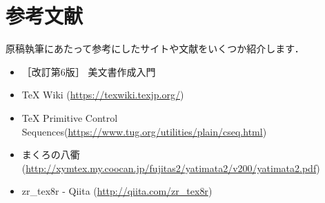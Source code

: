 \section*{参考文献}

原稿執筆にあたって参考にしたサイトや文献をいくつか紹介します．

\begin{itemize}
	\item ［改訂第6版］ {\LaTeXe} 美文書作成入門
	\item TeX Wiki (\url{https://texwiki.texjp.org/})
	\item TeX Primitive Control Sequences(\url{https://www.tug.org/utilities/plain/cseq.html})
	\item {\LaTeXe}まくろの八衢 (\url{http://xymtex.my.coocan.jp/fujitas2/yatimata2/v200/yatimata2.pdf})
	\item zr\_tex8r - Qiita (\url{http://qiita.com/zr_tex8r})
\end{itemize}
